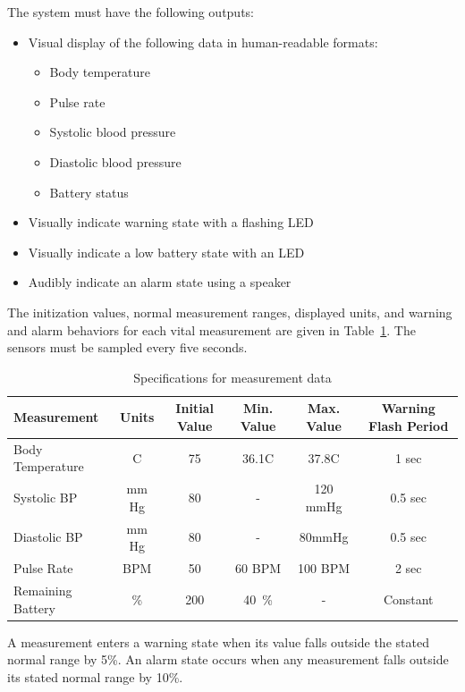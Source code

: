 \documentclass[12pt]{article} %
\begin{document}
\begin{itemize}[$$]
 \item The system must have the following outputs:
    \begin{itemize}[$\bullet$]
      \item Visual display of the following data in human-readable formats:
	\begin{itemize}
	\item Body temperature
	\item Pulse rate
	\item Systolic blood pressure
	\item Diastolic blood pressure
	\item Battery status
	\end{itemize}
      \item Visually indicate warning state with a flashing LED
      \item Visually indicate a low battery state with an LED
      \item Audibly indicate an alarm state using a speaker
    \end{itemize}
\end{itemize}

The initization values, normal measurement ranges, displayed units, and 
warning and alarm behaviors for each vital measurement are given in 
Table~\ref{tab:sensorDefs}. The sensors must be sampled every five seconds.

\begin{table}[h]
  \centering
  \begin{tabular}{|l|*{5}{c}|}
    \hline
    Measurement & Units & Initial Value & Min. Value & Max. Value & Warning Flash Period \\ \hline
    Body Temperature & C & 75 & 36.1C & 37.8C & 1 sec \\ \hline
    Systolic BP  & mm Hg & 80 & - & 120 mmHg & 0.5 sec \\ \hline
    Diastolic BP & mm Hg & 80 & - & 80mmHg & 0.5 sec \\ \hline
    Pulse Rate & BPM & 50 & 60 BPM & 100 BPM & 2 sec \\ \hline
    Remaining Battery & \% & 200 & 40~\% & - & Constant \\ \hline
  \end{tabular}
  \caption{Specifications for measurement data}
  \label{tab:sensorDefs}
\end{table}

A measurement enters a warning state when its value falls outside the stated 
normal range by 5\%. An alarm state occurs when any measurement falls outside
 its stated normal range by 10\%.
\end{document}

